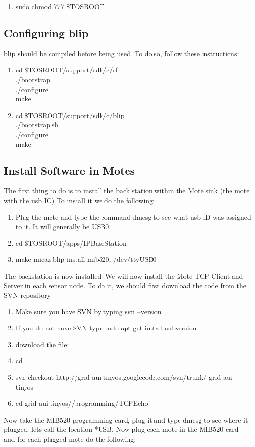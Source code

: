 \documentclass[oneside,12pt,a4paper,final]{book}
\begin{document}
\begin{appendices}
\begin{enumerate}
\item sudo chmod 777 \$TOSROOT
\end{enumerate}

\subsection{Configuring \gls{blip}}
\gls{blip} should be compiled before being used. To do so, follow these instructions:
\begin{enumerate}
\item cd \$TOSROOT/support/sdk/c/sf \\
./bootstrap \\
./configure \\
make 
\item cd \$TOSROOT/support/sdk/c/blip \\
./bootstrap.sh \\
./configure \\
make 
\end{enumerate}

\subsection{Install Software in Motes}
The first thing to do is to install the back station within the Mote sink (the mote with the \gls{usb} IO) To install it we do the following:
\begin{enumerate}
\item Plug the mote and type the command dmesg to see what \gls{usb} ID was assigned to it. It will generally be USB0.
\item cd \$TOSROOT/apps/IPBaseStation
\item make micaz blip install  mib520, /dev/ttyUSB0
\end{enumerate}
The backstation is now installed. We will now install the Mote TCP Client and Server in each sensor node. To do it, we should first download the code from the SVN repository.
\begin{enumerate}
\item Make sure you have SVN by typing svn --version
\item If you do not have SVN type sudo apt-get install subversion
\item download the file:
\item cd
\item svn checkout http://grid-aui-tinyos.googlecode.com/svn/trunk/ grid-aui-tinyos
\item cd grid-aui-tinyos//programming/TCPEcho
\end{enumerate}
Now take the MIB520 programming card, plug it and type dmesg to see where it plugged. lets call the location *USB. Now plug each mote in the MIB520 card and for each plugged mote do the following:


\end{appendices}
\end{document}
